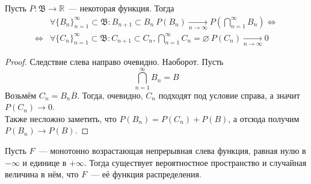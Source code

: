 \documentclass{article}
\newcommand{\B}{{\mathfrak B}}
\begin{document}
    \begin{lemma}
        Пусть $P\colon\B\to\mathbb R$~--- некоторая функция. Тогда
        \[\begin{split}
            &\forall\{B_n\}_{n=1}^\infty\subset\B:B_{n+1}\subset B_n~P(B_n)\underset{n\to\infty}\rightarrow P\left(\bigcap\limits_{n=1}^\infty B_n\right)\Leftrightarrow\\
            \Leftrightarrow&\forall\{C_n\}_{n=1}^\infty\subset\B:C_{n+1}\subset C_n,\bigcap\limits_{n=1}^\infty C_n=\varnothing~P(C_n)\underset{n\to\infty}\rightarrow0
        \end{split}\]
    \end{lemma}
    \begin{proof}
        Следствие слева направо очевидно. Наоборот. Пусть
        $$
        \bigcap\limits_{n=1}^\infty B_n=B
        $$
        Возьмём $C_n=B_n\overline{B}$. Тогда, очевидно, $C_n$ подходят под условие справа, а значит $P(C_n)\longrightarrow0$.\\
        Также несложно заметить, что $P(B_n)=P(C_n)+P(B)$, а отсюда получим $P(B_n)\longrightarrow P(B)$.
    \end{proof}
    \begin{theorem}
        Пусть $F$~--- монотонно возрастающая непрерывная слева функция, равная нулю в $-\infty$ и единице в $+\infty$. Тогда существует вероятностное пространство и случайная величина в нём, что $F$~--- её функция распределения.
    \end{theorem}
\end{document}
